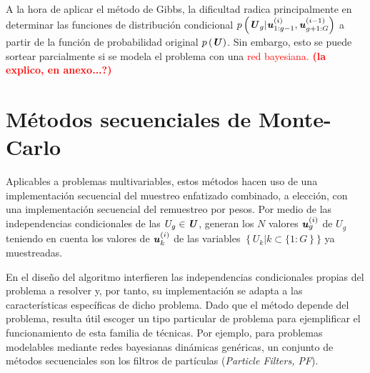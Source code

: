 A la hora de aplicar el método de Gibbs, la dificultad radica principalmente en determinar las funciones de distribución condicional $p\left(\textbf{\textit{U}}_{g}|\textbf{\textit{u}}^{(i)}_{1:g-1}, \textbf{\textit{u}}^{(i-1)}_{g+1:G}\right)$ a partir de la función de probabilidad original $p\left(\textbf{\textit{U}}\right)$. Sin embargo, esto se puede sortear parcialmente si se modela el problema con una \textcolor{red}{red bayesiana. \textbf{(la explico, en anexo...?)}}


\section{Métodos secuenciales de Monte-Carlo}
Aplicables a problemas multivariables, estos métodos hacen uso de una implementación secuencial del muestreo enfatizado combinado, a elección, con una implementación secuencial del remuestreo por pesos. Por medio de las independencias condicionales de las $U_{g} \in \textbf{\textit{U}}$, generan los $N$ valores $\textbf{\textit{u}}^{(i)}_{g}$ de $U_{g}$ teniendo en cuenta los valores de $\textbf{\textit{u}}^{(i)}_{k}$ de las variables $\left\{U_{k}|k \subset \{1:G\right\}\}$ ya muestreadas.

En el diseño del algoritmo interfieren las independencias condicionales propias del problema a resolver y, por tanto, su implementación se adapta a las características específicas de dicho problema. Dado que el método depende del problema, resulta útil escoger un tipo particular de problema para ejemplificar el funcionamiento de esta familia de técnicas. Por ejemplo, para problemas modelables mediante redes bayesianas dinámicas genéricas, un conjunto de métodos secuenciales son los filtros de partículas (\textit{Particle Filters, PF}).

